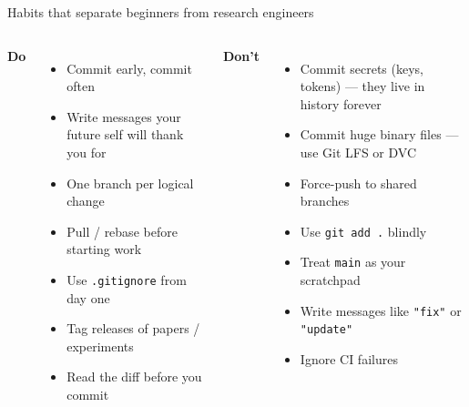 \documentclass[10pt,aspectratio=169]{beamer}
\begin{document}
\begin{frame}{Habits that separate beginners from research engineers}
  \begin{columns}[T]
    \textbf{\color{ghGreen}Do}
    \begin{itemize}
      \item Commit early, commit often
      \item Write messages your future self will thank you for
      \item One branch per logical change
      \item Pull / rebase before starting work
      \item Use \texttt{.gitignore} from day one
      \item Tag releases of papers / experiments
      \item Read the diff before you commit
    \end{itemize}

    \textbf{\color{ghOrange}Don't}
    \begin{itemize}
      \item Commit secrets (keys, tokens) --- they live in history forever
      \item Commit huge binary files --- use Git LFS or DVC
      \item Force-push to shared branches
      \item Use \texttt{git add .} blindly
      \item Treat \texttt{main} as your scratchpad
      \item Write messages like \texttt{"fix"} or \texttt{"update"}
      \item Ignore CI failures
    \end{itemize}
  \end{columns}
\end{frame}
\end{document}
